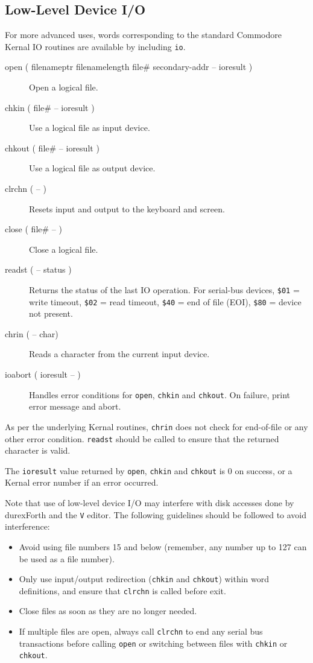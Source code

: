 \subsection{Low-Level Device I/O}

For more advanced uses, words corresponding to the standard Commodore Kernal IO routines are available by including \texttt{io}.

\begin{description}
    \item[open ( filenameptr filenamelength file\# secondary-addr -- ioresult )] Open a logical file.
    \item[chkin ( file\# -- ioresult )] Use a logical file as input device.
    \item[chkout ( file\# -- ioresult )] Use a logical file as output device.
    \item[clrchn ( -- )] Resets input and output to the keyboard and screen.
    \item[close ( file\# -- )] Close a logical file.
    \item[readst ( -- status )] Returns the status of the last IO operation. For serial-bus devices, \texttt{\$01} = write timeout, \texttt{\$02} = read timeout, \texttt{\$40} = end of file (EOI), \texttt{\$80} = device not present.
    \item[chrin ( -- char)] Reads a character from the current input device.
    \item[ioabort ( ioresult -- )] Handles error conditions for \texttt{open}, \texttt{chkin} and \texttt{chkout}. On failure, print error message and abort.
\end{description}

As per the underlying Kernal routines, \texttt{chrin} does not check for end-of-file or any other error condition. \texttt{readst} should be called to ensure that the returned character is valid.

The \texttt{ioresult} value returned by \texttt{open}, \texttt{chkin} and \texttt{chkout} is 0 on success, or a Kernal error number if an error occurred.

Note that use of low-level device I/O may interfere with disk accesses done by durexForth and the \texttt{V} editor. The following guidelines should be followed to avoid interference:

\begin{itemize}
    \item Avoid using file numbers 15 and below (remember, any number up to 127 can be used as a file number).
    \item Only use input/output redirection (\texttt{chkin} and \texttt{chkout}) within word definitions, and ensure that \texttt{clrchn} is called before exit.
    \item Close files as soon as they are no longer needed.
    \item If multiple files are open, always call \texttt{clrchn} to end any serial bus transactions before calling \texttt{open} or switching between files with \texttt{chkin} or \texttt{chkout}.
\end{itemize}

